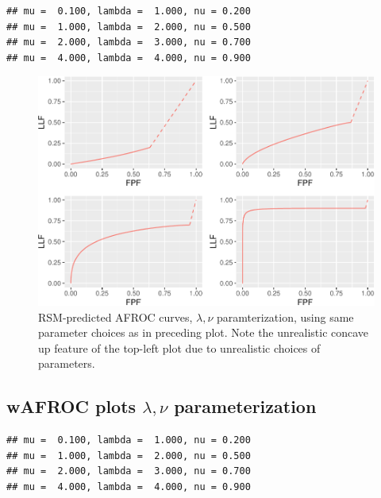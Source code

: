 \documentclass[
]{book}
\begin{document}
\begin{verbatim}
## mu =  0.100, lambda =  1.000, nu = 0.200 
## mu =  1.000, lambda =  2.000, nu = 0.500 
## mu =  2.000, lambda =  3.000, nu = 0.700 
## mu =  4.000, lambda =  4.000, nu = 0.900
\end{verbatim}

\begin{figure}
\centering
\includegraphics{08-rsm-predictions2_files/figure-latex/rsm-other-predictions-afroc-plots-lambda-nu-1.pdf}
\caption{\label{fig:rsm-other-predictions-afroc-plots-lambda-nu}RSM-predicted AFROC curves, \(\lambda, \nu\) paramterization, using same parameter choices as in preceding plot. Note the unrealistic concave up feature of the top-left plot due to unrealistic choices of parameters.}
\end{figure}

\hypertarget{rsm-other-predictions-wafroc-physical-parameters}{%
\subsection{\texorpdfstring{wAFROC plots \(\lambda, \nu\) parameterization}{wAFROC plots \textbackslash lambda, \textbackslash nu parameterization}}\label{rsm-other-predictions-wafroc-physical-parameters}}

\begin{verbatim}
## mu =  0.100, lambda =  1.000, nu = 0.200 
## mu =  1.000, lambda =  2.000, nu = 0.500 
## mu =  2.000, lambda =  3.000, nu = 0.700 
## mu =  4.000, lambda =  4.000, nu = 0.900
\end{verbatim}
\end{document}
